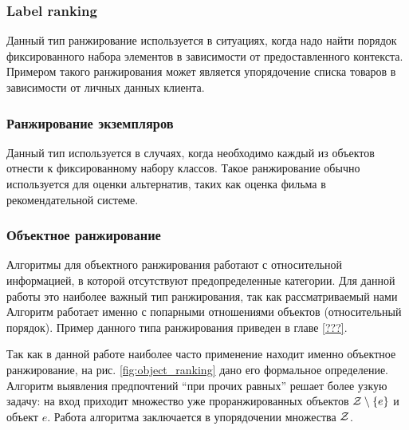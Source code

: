 	\subsubsection{Label ranking}
		Данный тип ранжирование используется в ситуациях, когда надо найти порядок фиксированного набора элементов в зависимости от предоставленного контекста. Примером такого ранжирования может является упорядочение списка товаров в зависимости от личных данных клиента.
	
	\subsubsection{Ранжирование экземпляров}
		Данный тип используется в случаях, когда необходимо каждый из объектов отнести к фиксированному набору классов. Такое ранжирование обычно используется для оценки альтернатив, таких как оценка фильма в рекомендательной системе.
	
	\subsubsection{Объектное ранжирование}
		Алгоритмы для объектного ранжирования работают с 
		относительной %
		информацией, в которой отсутствуют предопределенные категории. Для данной работы это наиболее важный тип ранжирования, так как рассматриваемый нами Алгоритм работает именно с попарными отношениями объектов (относительный порядок). Пример данного типа ранжирования приведен в главе \ref{???}.
		
		Так как в данной работе наиболее часто применение находит именно объектное ранжирование, на рис. \ref{fig:object_ranking} дано его формальное определение. Алгоритм выявления предпочтений \enquote{при прочих равных} решает более узкую задачу: на вход приходит множество уже проранжированных объектов $\mathcal{Z} \setminus \{e\}$ и объект $e$. Работа алгоритма заключается в упорядочении множества $\mathcal{Z}$.
		
